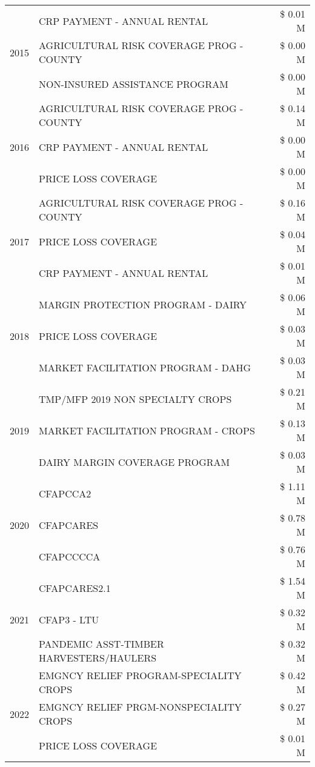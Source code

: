 \begin{tabular}{llr}
\cline{1-3}
\multirow[t]{3}{*}{2015} & CRP PAYMENT - ANNUAL RENTAL & \$ 0.01 M \\
 & AGRICULTURAL RISK COVERAGE PROG - COUNTY & \$ 0.00 M \\
 & NON-INSURED ASSISTANCE PROGRAM & \$ 0.00 M \\
\cline{1-3}
\multirow[t]{3}{*}{2016} & AGRICULTURAL RISK COVERAGE PROG - COUNTY & \$ 0.14 M \\
 & CRP PAYMENT - ANNUAL RENTAL & \$ 0.00 M \\
 & PRICE LOSS COVERAGE & \$ 0.00 M \\
\cline{1-3}
\multirow[t]{3}{*}{2017} & AGRICULTURAL RISK COVERAGE PROG - COUNTY & \$ 0.16 M \\
 & PRICE LOSS COVERAGE & \$ 0.04 M \\
 & CRP PAYMENT - ANNUAL RENTAL & \$ 0.01 M \\
\cline{1-3}
\multirow[t]{3}{*}{2018} & MARGIN PROTECTION PROGRAM - DAIRY & \$ 0.06 M \\
 & PRICE LOSS COVERAGE & \$ 0.03 M \\
 & MARKET FACILITATION PROGRAM - DAHG & \$ 0.03 M \\
\cline{1-3}
\multirow[t]{3}{*}{2019} & TMP/MFP 2019 NON SPECIALTY CROPS & \$ 0.21 M \\
 & MARKET FACILITATION PROGRAM - CROPS & \$ 0.13 M \\
 & DAIRY MARGIN COVERAGE PROGRAM & \$ 0.03 M \\
\cline{1-3}
\multirow[t]{3}{*}{2020} & CFAPCCA2 & \$ 1.11 M \\
 & CFAPCARES & \$ 0.78 M \\
 & CFAPCCCCA & \$ 0.76 M \\
\cline{1-3}
\multirow[t]{3}{*}{2021} & CFAPCARES2.1 & \$ 1.54 M \\
 & CFAP3 - LTU & \$ 0.32 M \\
 & PANDEMIC ASST-TIMBER HARVESTERS/HAULERS & \$ 0.32 M \\
\cline{1-3}
\multirow[t]{3}{*}{2022} & EMGNCY RELIEF PROGRAM-SPECIALITY CROPS & \$ 0.42 M \\
 & EMGNCY RELIEF PRGM-NONSPECIALITY CROPS & \$ 0.27 M \\
 & PRICE LOSS COVERAGE & \$ 0.01 M \\
\cline{1-3}
\bottomrule
\end{tabular}
